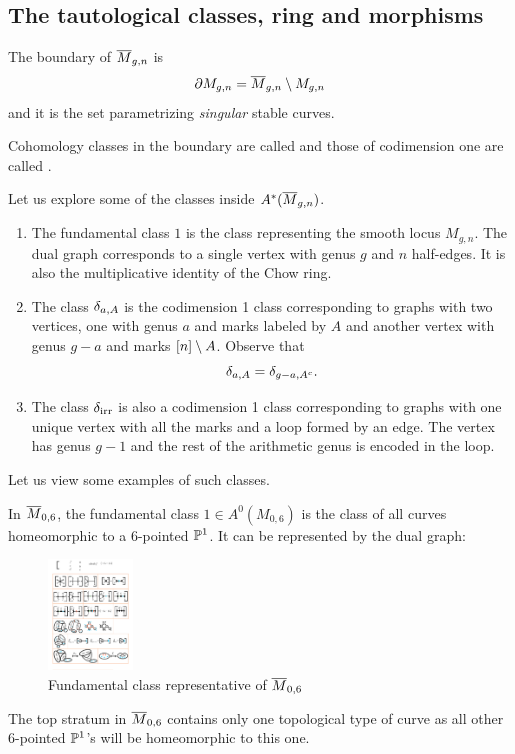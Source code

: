 \documentclass[12pt]{memoir}
\begin{document}
\subsection{The tautological classes, ring and morphisms}

\begin{Def}
    The boundary of $\overline M_{g,n}$ is 
    $$\partial M_{g,n}=\overline M_{g,n}\setminus M_{g,n}$$
    and it is the set parametrizing \emph{singular} stable curves.\par
    Cohomology classes in the boundary are called  and those of codimension one are called .  
\end{Def}

Let us explore some of the classes inside $A^\ast(\overline M_{g,n})$. 
\begin{enumerate}
    \item The fundamental class $1$ is the class representing the smooth locus $M_{g,n}$. The dual graph corresponds to a single vertex with genus $g$ and $n$ half-edges. It is also the multiplicative identity of the Chow ring.
    \item The class $\delta_{a,A}$ is the codimension 1 class corresponding to graphs with two vertices, one with genus $a$ and marks labeled by $A$ and another vertex with genus $g-a$ and marks $\left\lbrack n\right\rbrack\setminus A$. Observe that 
    $$\delta_{a,A}=\delta_{g-a,A^c}.$$
    \item The class $\delta_{\text{irr}}$ is also a codimension 1 class corresponding to graphs with one unique vertex with all the marks and a loop formed by an edge. The vertex has genus $g-1$ and the rest of the arithmetic genus is encoded in the loop.
\end{enumerate}

Let us view some examples of such classes.

\begin{Ex}
    In $\overline M_{0,6}$, the fundamental class $1\in A^0(M_{0,6})$ is the class of all curves homeomorphic to a 6-pointed $\mathbb{P}^1$. It can be represented by the dual graph:\par
    \begin{figure}[h!]
        \centering
        \includegraphics[width=0.2\textwidth, trim= 1.32cm 20.75cm 16.53cm 3.9cm,clip]{../figs/FigsDNnotability1.pdf}
        \caption{Fundamental class representative of $\overline{M}_{0,6}$}
        \label{fig:fundamental-class-M06}
    \end{figure} 
    The top stratum in $\overline M_{0,6}$ contains only one topological type of curve as all other $6$-pointed $\mathbb{P}^1$'s will be homeomorphic to this one.
\end{Ex}
\end{document}
